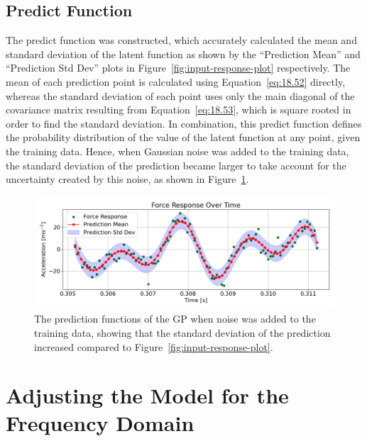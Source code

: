 \documentclass[12pt]{article}
\begin{document}
    \subsection{Predict Function}
    The predict function was constructed, which accurately calculated the mean and standard deviation of the latent function as shown by the ``Prediction Mean'' and ``Prediction Std Dev'' plots in Figure~\ref{fig:input-response-plot} respectively.
    The mean of each prediction point is calculated using Equation~\ref{eq:18.52} directly, whereas the standard deviation of each point uses only the main diagonal of the covariance matrix resulting from Equation~\ref{eq:18.53}, which is square rooted in order to find the standard deviation.
    In combination, this predict function defines the probability distribution of the value of the latent function at any point, given the training data.
    Hence, when Gaussian noise was added to the training data, the standard deviation of the prediction became larger to take account for the uncertainty created by this noise, as shown in Figure~\ref{fig:input-response-noise}.

    \begin{figure}[ht]
        \centering
        \includegraphics[width=1.0\linewidth]{figures/input-response-noise/input-response-noise.png}
        \caption{The prediction functions of the GP when noise was added to the training data, showing that the standard deviation of the prediction increased compared to Figure~\ref{fig:input-response-plot}.}
        \label{fig:input-response-noise}
    \end{figure}

    \section{Adjusting the Model for the Frequency Domain}
\end{document}
